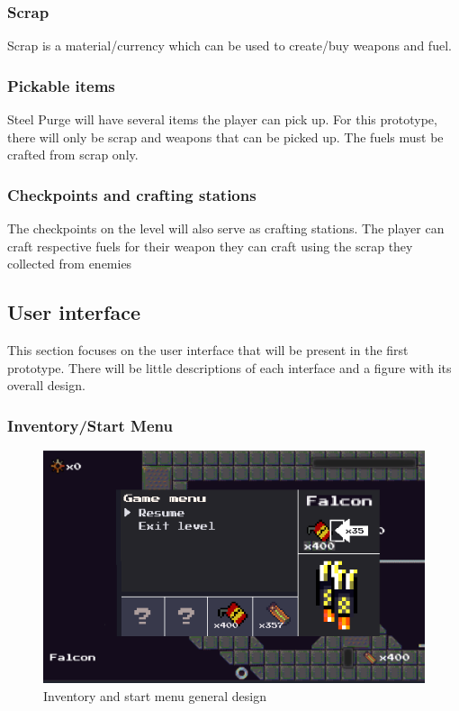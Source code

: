 \documentclass[../Main.tex]{subfiles}
\begin{document}
\subsubsection{Scrap}

Scrap is a material/currency which can be used to create/buy weapons and fuel. 

\subsubsection{Pickable items}

Steel Purge will have several items the player can pick up. For this prototype, there will only be scrap and weapons that can be picked up. The fuels must be crafted from scrap only.

\subsubsection{Checkpoints and crafting stations}

The checkpoints on the level will also serve as crafting stations. The player can craft respective fuels for their weapon they can craft using the scrap they collected from enemies

\subsection{User interface}

This section focuses on the user interface that will be present in the first prototype. There will be little descriptions of each interface and a figure with its overall design.

\subsubsection{Inventory/Start Menu}

\begin{figure}[H]
	\centering
	\includegraphics[width=\columnwidth]{Figures/InventoryUI.png}
	\caption{Inventory and start menu general design}
\end{figure}
\end{document}
